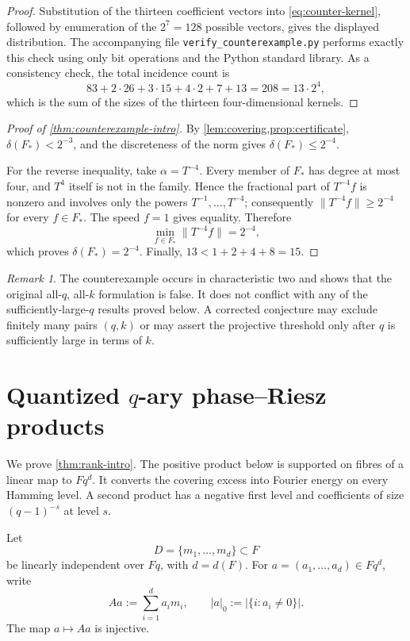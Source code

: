 \documentclass[11pt,reqno]{amsart}
\numberwithin{equation}{section}
\theoremstyle{definition}
\theoremstyle{remark}
\newtheorem{remark}[remark]{Remark}
\newcommand{\Fq}{\mathbb F_q}
\newcommand{\cF}{\mathcal F}
\newcommand{\cD}{\mathcal D}
\newcommand{\abs}[1]{\lvert#1\rvert}
\newcommand{\norm}[1]{\lVert#1\rVert}
\newcommand{\set}[1]{\{#1\}}
\def\Fq{Fq}%
\def\mathbb#1{#1}%
\def\mathcal#1{#1}%
\begin{document}
\begin{proof}
Substitution of the thirteen coefficient vectors into
\eqref{eq:counter-kernel}, followed by enumeration of the
$2^7=128$ possible vectors, gives the displayed distribution.  The accompanying file \texttt{verify\_counterexample.py} performs exactly this check using only bit operations and the Python standard library.  As a consistency check, the total incidence count is
\[
 83+2\cdot26+3\cdot15+4\cdot2+7+13
 =208
 =13\cdot2^4,
\]
which is the sum of the sizes of the thirteen four-dimensional kernels.
\end{proof}

\begin{proof}[Proof of \cref{thm:counterexample-intro}]
By \cref{lem:covering,prop:certificate},
$\delta(\cF_*)<2^{-3}$, and the discreteness of the norm gives
$\delta(\cF_*)\le2^{-4}$.

For the reverse inequality, take $\alpha=T^{-4}$.  Every member of
$\cF_*$ has degree at most four, and $T^4$ itself is not in the family.  Hence the fractional part of $T^{-4}f$ is nonzero and involves only the powers
$T^{-1},\ldots,T^{-4}$; consequently
$\norm{T^{-4}f}\ge2^{-4}$ for every $f\in\cF_*$.  The speed $f=1$ gives equality.  Therefore
\[
 \min_{f\in\cF_*}\norm{T^{-4}f}=2^{-4},
\]
which proves $\delta(\cF_*)=2^{-4}$.  Finally,
$13<1+2+4+8=15$.
\end{proof}

\begin{remark}
The counterexample occurs in characteristic two and shows that the original all-$q$, all-$k$ formulation is false.  It does not conflict with any of the sufficiently-large-$q$ results proved below.  A corrected conjecture may exclude finitely many pairs $(q,k)$ or may assert the projective threshold only after $q$ is sufficiently large in terms of $k$.
\end{remark}

\section{Quantized \texorpdfstring{$q$}{q}-ary phase--Riesz products}\label{sec:phase}

We prove \cref{thm:rank-intro}.  The positive product below is supported on fibres of a linear map to $\Fq^d$.  It converts the covering excess into Fourier energy on every Hamming level.  A second product has a negative first level and coefficients of size $(q-1)^{-s}$ at level $s$.

Let
\begin{equation}\label{eq:D-independent}
 \cD=\set{m_1,\ldots,m_d}\subset\cF
\end{equation}
be linearly independent over $\Fq$, with $d=d(\cF)$.  For
$a=(a_1,\ldots,a_d)\in\Fq^d$, write
\begin{equation}\label{eq:Aa-def}
 Aa:=\sum_{i=1}^da_im_i,
 \qquad
 |a|_0:=\abs{\set{i:a_i\ne0}}.
\end{equation}
The map $a\mapsto Aa$ is injective.
\end{document}
